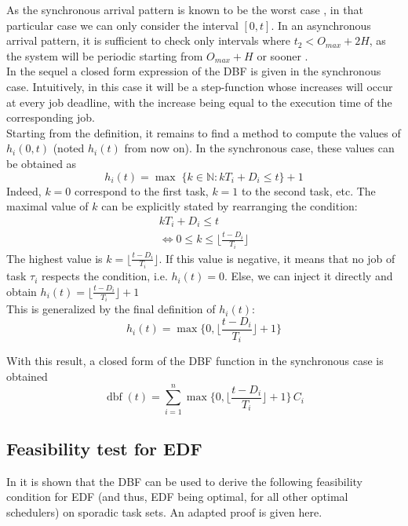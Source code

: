 \documentclass[a4paper,10pt]{article}
\newcommand{\dbf}[1]{\operatorname{dbf}(#1)}
\begin{document}
As the synchronous arrival pattern is known to be the worst case
\cite{liu1973scheduling}, in that particular case we can only consider the
interval $[0, t]$. In an asynchronous arrival pattern, it is sufficient to check
only intervals where $t_2 < O_{max} + 2H$, as the system will be
periodic starting from $O_{max} + H$ or sooner \cite{leung1982complexity}.\\

In the sequel a closed form expression of the DBF is given in the synchronous
case. Intuitively, in this case it will be a step-function whose increases will
occur at every job deadline, with the increase being equal to the execution time of the corresponding job.\\

Starting from the definition, it remains to find a method to compute the values
of $h_i(0, t)$ (noted $h_i(t)$ from now on). In the synchronous case, these
values can be obtained as 
\[
	h_i(t) = \operatorname{max} \; \{ k \in \mathbb{N} :
	k T_i  + D_i \leq t \} + 1
\]
Indeed, $k = 0$ correspond to the first task, $k = 1$ to the second task, etc.
The maximal value of $k$ can be explicitly stated by rearranging the condition:
\[
	\begin{array}{c}
		k T_i + D_i \leq t \\
		\iff 0 \leq k \leq \lfloor \frac{t - D_i}{T_i} \rfloor
	\end{array}
\]
The highest value is $k = \lfloor \frac{t - D_i}{T_i} \rfloor$. If this value is
negative, it means that no job of task $\tau_i$ respects the condition, i.e.
$h_i(t) = 0$. Else, we can inject it directly and obtain $h_i(t) = \lfloor \frac{t - D_i}{T_i} \rfloor + 1$\\

This is generalized by the final definition of $h_i(t)$: $$h_i(t) = \operatorname{max} \{ 0, \lfloor \frac{t - D_i}{T_i} \rfloor + 1 \}$$

With this result, a closed form of the DBF function in the synchronous case is
obtained $$\dbf{t} = \sum_{i=1}^{n} \operatorname{max} \{ 0, \lfloor \frac{t - D_i}{T_i} \rfloor + 1 \} \, C_i$$

\subsection{Feasibility test for EDF}

In \cite{baruah1990algorithms} it is shown that the DBF can be used to
derive the following feasibility condition for EDF (and thus, EDF being
optimal, for all other optimal schedulers) on sporadic task sets. An adapted
proof is given here.
\end{document}

